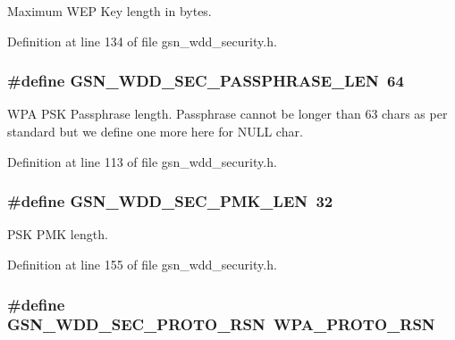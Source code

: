 Maximum WEP Key length in bytes. 



Definition at line 134 of file gsn\_\-wdd\_\-security.h.

\hypertarget{a00604_ad4bdfab3bec6e6e53d234319b63b904b}{
\subsubsection[{GSN\_\-WDD\_\-SEC\_\-PASSPHRASE\_\-LEN}]{\setlength{\rightskip}{0pt plus 5cm}\#define GSN\_\-WDD\_\-SEC\_\-PASSPHRASE\_\-LEN~64}}
\label{a00604_ad4bdfab3bec6e6e53d234319b63b904b}


WPA PSK Passphrase length. Passphrase cannot be longer than 63 chars as per standard but we define one more here for NULL char. 



Definition at line 113 of file gsn\_\-wdd\_\-security.h.

\hypertarget{a00604_aae41cfc2009ee669de847fcc20cc8a89}{
\subsubsection[{GSN\_\-WDD\_\-SEC\_\-PMK\_\-LEN}]{\setlength{\rightskip}{0pt plus 5cm}\#define GSN\_\-WDD\_\-SEC\_\-PMK\_\-LEN~32}}
\label{a00604_aae41cfc2009ee669de847fcc20cc8a89}


PSK PMK length. 



Definition at line 155 of file gsn\_\-wdd\_\-security.h.

\hypertarget{a00604_a623ba5d123546d9c09c0e8297656ee6d}{
\subsubsection[{GSN\_\-WDD\_\-SEC\_\-PROTO\_\-RSN}]{\setlength{\rightskip}{0pt plus 5cm}\#define GSN\_\-WDD\_\-SEC\_\-PROTO\_\-RSN~WPA\_\-PROTO\_\-RSN}}
\label{a00604_a623ba5d123546d9c09c0e8297656ee6d}


